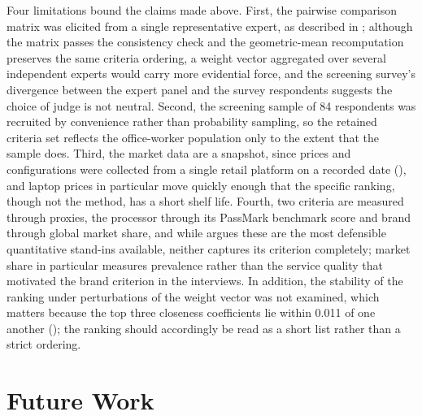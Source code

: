 Four limitations bound the claims made above. First, the pairwise comparison matrix was
elicited from a single representative expert, as described in ; although
the matrix passes the consistency check and the geometric-mean recomputation preserves
the same criteria ordering, a weight vector aggregated over several independent experts
would carry more evidential force, and the screening survey's divergence between the
expert panel and the survey respondents suggests the choice of judge is not neutral. Second, the
screening sample of 84 respondents was recruited by convenience rather than probability
sampling, so the retained criteria set reflects the office-worker population only to the
extent that the sample does. Third, the market data are a snapshot, since prices and
configurations were collected from a single retail platform on a recorded date
(), and laptop prices in particular move quickly enough that the
specific ranking, though not the method, has a short shelf life. Fourth, two criteria are
measured through proxies, the processor through its PassMark benchmark score and brand
through global market share, and while  argues these are
the most defensible quantitative stand-ins available, neither captures its criterion
completely; market share in particular measures prevalence rather than the service
quality that motivated the brand criterion in the interviews. In addition, the stability
of the ranking under perturbations of the weight vector was not examined, which matters
because the top three closeness coefficients lie within 0.011 of one another
(); the ranking should accordingly be read as a short list rather than
a strict ordering.

\section{Future Work}\label{sec:future}

